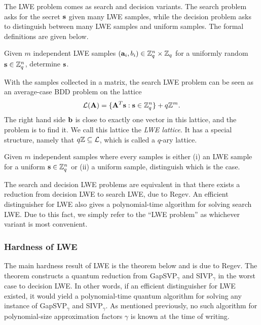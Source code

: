 The LWE problem comes as search and decision variants. The search problem asks for the secret $\mathbf{s}$ given many LWE samples, while the decision problem asks to distinguish between many LWE samples and uniform samples. The formal definitions are given below.

\begin{definition}
    Given $m$ independent LWE samples $(\mathbf{a}_i, b_i) \in \mathbb{Z}_q^{n} \times \mathbb{Z}_q$ for a uniformly random $\mathbf{s} \in \mathbb{Z}_q^{n}$, determine $\mathbf{s}$.
\end{definition}

With the samples collected in a matrix, the search LWE problem can be seen as an average-case BDD problem on the lattice
\[ \mathcal{L}(\mathbf{A}) = \{ \mathbf{A}^T \mathbf{s} : \mathbf{s} \in \mathbb{Z}_q^{n} \} + q \mathbb{Z}^m. \]
The right hand side $\mathbf{b}$ is close to exactly one vector in this lattice, and the problem is to find it. We call this lattice the \textit{LWE lattice}. It has a special structure, namely that $q \mathbb{Z} \subseteq \mathcal{L}$, which is called a $q$-ary lattice.

\begin{definition}
    Given $m$ independent samples where every samples is either (i) an LWE sample for a uniform $\mathbf{s} \in \mathbb{Z}_q^{n}$ or (ii) a uniform sample, distinguish which is the case.
\end{definition}

The search and decision LWE problems are equivalent in that there exists a reduction from decision LWE to search LWE, due to Regev. An efficient distinguisher for LWE also gives a polynomial-time algorithm for solving search LWE. Due to this fact, we simply refer to the ``LWE problem'' as whichever variant is most convenient.

\subsubsection{Hardness of LWE}
The main hardness result of LWE is the theorem below and is due to Regev. The theorem constructs a quantum reduction from GapSVP$_\gamma$ and SIVP$_\gamma$ in the worst case to decision LWE. In other words, if an efficient distinguisher for LWE existed, it would yield a polynomial-time quantum algorithm for solving any instance of GapSVP$_\gamma$ and SIVP$_\gamma$. As mentioned previously, no such algorithm for polynomial-size approximation factors $\gamma$ is known at the time of writing.

